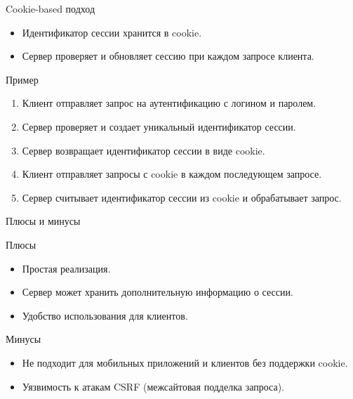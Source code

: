 \documentclass[
  ignorenonframetext,
  aspectratio=169,
  aspectratio=169]{beamer}
\providecommand{\tightlist}{%
  \setlength{\itemsep}{0pt}\setlength{\parskip}{0pt}}
\begin{document}
\begin{frame}{Cookie-based подход}
\protect\hypertarget{cookie-based-ux43fux43eux434ux445ux43eux434}{}
\begin{itemize}
\tightlist
\item
  Идентификатор сессии хранится в cookie.
\item
  Сервер проверяет и обновляет сессию при каждом запросе клиента.
\end{itemize}

\begin{block}{Пример}
\protect\hypertarget{ux43fux440ux438ux43cux435ux440}{}
\begin{enumerate}
\tightlist
\item
  Клиент отправляет запрос на аутентификацию с логином и паролем.
\item
  Сервер проверяет и создает уникальный идентификатор сессии.
\item
  Сервер возвращает идентификатор сессии в виде cookie.
\item
  Клиент отправляет запросы с cookie в каждом последующем запросе.
\item
  Сервер считывает идентификатор сессии из cookie и обрабатывает запрос.
\end{enumerate}
\end{block}

\begin{block}{Плюсы и минусы}
\protect\hypertarget{ux43fux43bux44eux441ux44b-ux438-ux43cux438ux43dux443ux441ux44b}{}
\begin{block}{Плюсы}
\protect\hypertarget{ux43fux43bux44eux441ux44b}{}
\begin{itemize}
\tightlist
\item
  Простая реализация.
\item
  Сервер может хранить дополнительную информацию о сессии.
\item
  Удобство использования для клиентов.
\end{itemize}
\end{block}

\begin{block}{Минусы}
\protect\hypertarget{ux43cux438ux43dux443ux441ux44b}{}
\begin{itemize}
\tightlist
\item
  Не подходит для мобильных приложений и клиентов без поддержки cookie.
\item
  Уязвимость к атакам CSRF (межсайтовая подделка запроса).
\end{itemize}
\end{block}
\end{block}
\end{frame}
\end{document}
